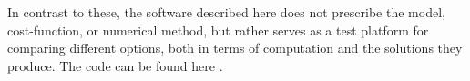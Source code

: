 In contrast to these, the software described here does not prescribe the model, cost-function, or numerical method, but rather serves as a test platform for comparing different options, both in terms of computation and the solutions they produce. The code can be found here \cite{ta_solver}.




 




